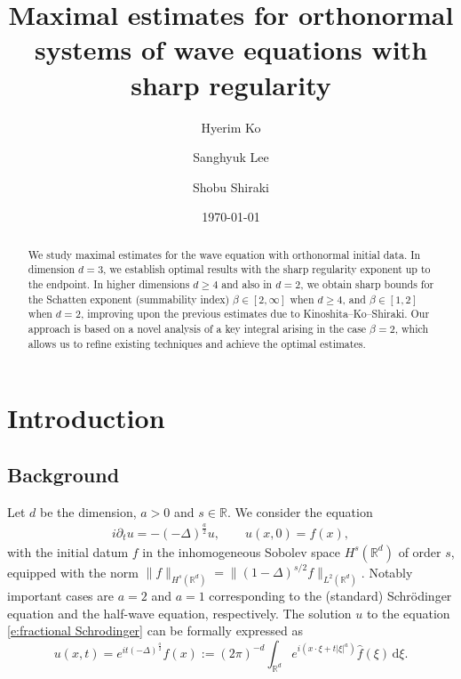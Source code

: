 \documentclass[a4paper]{amsart}
\author[Ko]{Hyerim Ko}
\author[Lee]{Sanghyuk Lee}
\author[Shiraki]{Shobu Shiraki}
\numberwithin{figure}{section}
\numberwithin{equation}{section}%
\theoremstyle{plain}%
\theoremstyle{definition}
\theoremstyle{remark}%
\def\d{\mathrm{d}}
\newcommand{\R}{{\mathbb R}}
\begin{document}
\date{\today}
\title[
]
{
Maximal estimates for orthonormal systems of wave equations with sharp regularity
}
\begin{abstract}
We study maximal estimates for the wave equation with orthonormal initial data. In dimension $d=3$, we establish optimal results  with the sharp regularity exponent  up to the endpoint. In higher dimensions $d \ge 4$ and also in $d=2$, we obtain sharp bounds for the Schatten exponent (summability index) $\beta\in [2, \infty]$ when $d\ge4$, and $\beta\in[1, 2]$ when $d=2$, improving upon the previous estimates due to Kinoshita–Ko–Shiraki. Our approach is based on a novel analysis of a key integral arising in the case $\beta=2$, which allows us to refine existing techniques and achieve the optimal estimates.
\end{abstract}

\maketitle




\section{Introduction}




\subsection{Background}

Let $d$ be the dimension, $a>0$ and $s\in \mathbb R$. We consider the equation
\begin{align}\label{e:fractional Schrodinger}
i \partial_t u =-(- \Delta)^\frac a2 u, \qquad
    u(x,0)=f(x),
\end{align}
with the initial datum $f$ in the inhomogeneous Sobolev space $H^s(\R^d)$ of order $s$, equipped with the norm $\|f\|_{H^s(\R^d)}=\| (1-\Delta)^{s/2}f\|_{L^2(\R^d)}$. Notably important cases are $a=2$ and $a=1$ corresponding to the (standard) Schr\"odinger equation and the half-wave equation, respectively. 
The solution $u$ to the equation \eqref{e:fractional Schrodinger}  can be  formally expressed as
\[
u(x, t)=e^{it(-\Delta)^\frac a2}f(x)
:=
(2\pi)^{-d}\int_{\R^d}e^{i(x\cdot \xi+t|\xi|^a)} \widehat f(\xi)\,\d\xi.
\]
\end{document}
